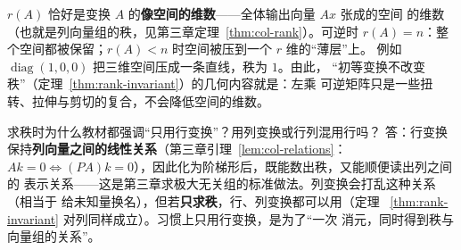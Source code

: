 \begin{insight}
$r(A)$ 恰好是变换 $A$ 的\textbf{像空间的维数}——全体输出向量 $Ax$ 张成的空间
的维数（也就是列向量组的秩，见第三章定理~\ref{thm:col-rank}）。可逆时
$r(A)=n$：整个空间都被保留；$r(A)<n$ 时空间被压到一个 $r$ 维的“薄层”上。
例如 $\operatorname{diag}(1,0,0)$ 把三维空间压成一条直线，秩为 $1$。由此，
“初等变换不改变秩”（定理~\ref{thm:rank-invariant}）的几何内容就是：左乘
可逆矩阵只是一些扭转、拉伸与剪切的复合，不会降低空间的维数。
\end{insight}

\begin{qa}{求秩时为什么教材都强调“只用行变换”？用列变换或行列混用行吗？}
答：行变换保持\textbf{列向量之间的线性关系}（第三章引理~\ref{lem:col-relations}：
$Ak=0\iff(PA)k=0$），因此化为阶梯形后，既能数出秩，又能顺便读出列之间的
表示关系——这是第三章求极大无关组的标准做法。列变换会打乱这种关系（相当于
给未知量换名），但若\textbf{只求秩}，行、列变换都可以用（定理
~\ref{thm:rank-invariant} 对列同样成立）。习惯上只用行变换，是为了“一次
消元，同时得到秩与向量组的关系”。
\end{qa}


